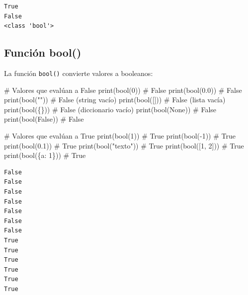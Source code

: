\documentclass[
  doc,
  floatsintext,
  longtable,
  a4paper,
  nolmodern,
  notxfonts,
  notimes,
  12pt,
  colorlinks=true,linkcolor=blue,citecolor=blue,urlcolor=blue]{apa7}
\newenvironment{Shaded}{\begin{snugshade}}{\end{snugshade}}
\newcommand{\BuiltInTok}[1]{\textcolor[rgb]{0.00,0.23,0.31}{#1}}
\newcommand{\CommentTok}[1]{\textcolor[rgb]{0.37,0.37,0.37}{#1}}
\newcommand{\DecValTok}[1]{\textcolor[rgb]{0.68,0.00,0.00}{#1}}
\newcommand{\FloatTok}[1]{\textcolor[rgb]{0.68,0.00,0.00}{#1}}
\newcommand{\NormalTok}[1]{\textcolor[rgb]{0.00,0.23,0.31}{#1}}
\newcommand{\OperatorTok}[1]{\textcolor[rgb]{0.37,0.37,0.37}{#1}}
\newcommand{\StringTok}[1]{\textcolor[rgb]{0.13,0.47,0.30}{#1}}
\newcommand{\VariableTok}[1]{\textcolor[rgb]{0.07,0.07,0.07}{#1}}
\begin{document}
\begin{verbatim}
True
False
<class 'bool'>
\end{verbatim}

\subsection{Función bool()}\label{funciuxf3n-bool}

La función \texttt{bool()} convierte valores a booleanos:

\begin{Shaded}
\begin{Highlighting}[]
\CommentTok{\# Valores que evalúan a False}
\BuiltInTok{print}\NormalTok{(}\BuiltInTok{bool}\NormalTok{(}\DecValTok{0}\NormalTok{))        }\CommentTok{\# False}
\BuiltInTok{print}\NormalTok{(}\BuiltInTok{bool}\NormalTok{(}\FloatTok{0.0}\NormalTok{))      }\CommentTok{\# False}
\BuiltInTok{print}\NormalTok{(}\BuiltInTok{bool}\NormalTok{(}\StringTok{""}\NormalTok{))       }\CommentTok{\# False (string vacío)}
\BuiltInTok{print}\NormalTok{(}\BuiltInTok{bool}\NormalTok{([]))       }\CommentTok{\# False (lista vacía)}
\BuiltInTok{print}\NormalTok{(}\BuiltInTok{bool}\NormalTok{(\{\}))       }\CommentTok{\# False (diccionario vacío)}
\BuiltInTok{print}\NormalTok{(}\BuiltInTok{bool}\NormalTok{(}\VariableTok{None}\NormalTok{))     }\CommentTok{\# False}
\BuiltInTok{print}\NormalTok{(}\BuiltInTok{bool}\NormalTok{(}\VariableTok{False}\NormalTok{))    }\CommentTok{\# False}

\CommentTok{\# Valores que evalúan a True}
\BuiltInTok{print}\NormalTok{(}\BuiltInTok{bool}\NormalTok{(}\DecValTok{1}\NormalTok{))        }\CommentTok{\# True}
\BuiltInTok{print}\NormalTok{(}\BuiltInTok{bool}\NormalTok{(}\OperatorTok{{-}}\DecValTok{1}\NormalTok{))       }\CommentTok{\# True}
\BuiltInTok{print}\NormalTok{(}\BuiltInTok{bool}\NormalTok{(}\FloatTok{0.1}\NormalTok{))      }\CommentTok{\# True}
\BuiltInTok{print}\NormalTok{(}\BuiltInTok{bool}\NormalTok{(}\StringTok{"texto"}\NormalTok{))  }\CommentTok{\# True}
\BuiltInTok{print}\NormalTok{(}\BuiltInTok{bool}\NormalTok{([}\DecValTok{1}\NormalTok{, }\DecValTok{2}\NormalTok{]))   }\CommentTok{\# True}
\BuiltInTok{print}\NormalTok{(}\BuiltInTok{bool}\NormalTok{(\{}\StringTok{\textquotesingle{}a\textquotesingle{}}\NormalTok{: }\DecValTok{1}\NormalTok{\})) }\CommentTok{\# True}
\end{Highlighting}
\end{Shaded}

\begin{verbatim}
False
False
False
False
False
False
False
True
True
True
True
True
True
\end{verbatim}
\end{document}
